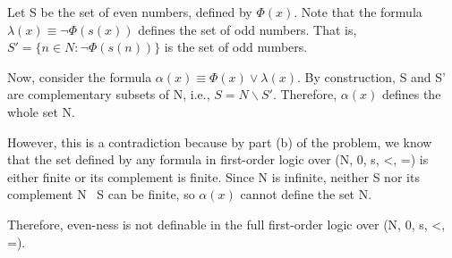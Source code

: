 \documentclass{article}
\begin{document}
Let S be the set of even numbers, defined by $\Phi (x)$. Note that the formula $\lambda (x) \equiv \neg \Phi (s(x))$ defines the set of odd numbers. That is, $S' = \{n \in N : \neg \Phi (s(n)) \}$ is the set of odd numbers.

Now, consider the formula $\alpha (x) \equiv \Phi (x) \lor \lambda(x)$. By construction, S and S' are complementary subsets of N, i.e., $S = N \backslash S'$. Therefore, $\alpha(x)$ defines the whole set N.

However, this is a contradiction because by part (b) of the problem, we know that the set defined by any formula in first-order logic over (N, 0, s, <, =) is either finite or its complement is finite. Since N is infinite, neither S nor its complement N \ S can be finite, so $\alpha(x)$ cannot define the set N.

Therefore, even-ness is not definable in the full first-order logic over (N, 0, s, <, =).
\end{document}
